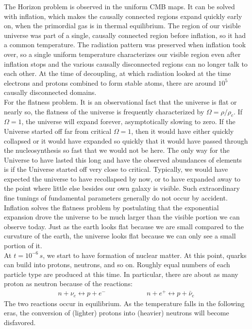 \documentclass[11pt]{article}
\theoremstyle{break}
\theoremstyle{break}
\begin{document}
The Horizon problem is observed in the uniform CMB maps. It can be solved with inflation, which makes the causally connected regions expand quickly early on, when the primordial gas is in thermal equilibrium. The region of our visible universe was part of a single, causally connected region before inflation, so
it had a common temperature. The radiation pattern was preserved when inflation took
over, so a single uniform temperature characterizes our visible region even after inflation stops and the various causally disconnected regions can no longer talk to each other. At the time of decoupling, at which radiation looked at the time electrons and protons combined to form stable atoms, there are around $10^5$ 
causally disconnected domains.\\

For the flatness problem. It is an observational fact that the universe is flat or nearly so, the flatness of the universe is frequently characterized by $\Omega =  \rho / \rho_c$. If $\Omega = 1$, the universe will expand forever, asymptotically slowing to zero. If the Universe started off far from critical $\Omega = 1$, then it would have either quickly collapsed or it would have expanded so quickly that it would have passed through the nucleosynthesis so fast that we would not be here. The only way for the Universe to have lasted this long and have the observed abundances of elements is if the Universe started off very close to critical. Typically, we would have expected the universe to have recollapsed by now, or to have expanded away to the point where little else besides our own galaxy is visible. Such extraordinary fine tunings of fundamental parameters generally do not occur by accident. Inflation solves the flatness problem by postulating that the exponential expansion drove the universe to be much larger than the visible portion we can observe today. Just as the earth looks flat because we are small compared to the curvature of the earth, the universe looks flat because we can only see a small portion of it.\\

At $t=10^{-6}\, s$, we start to have formation of nuclear matter. At this point, quarks can build into protons, neutrons, and so on. Roughly equal numbers of each particle type are produced at this time. In particular, there are about as many proton as neutron because of the reactions:
\begin{align*}
n + \nu_e \leftrightarrow p+e^- \qquad\qquad\qquad n+e^+ \leftrightarrow p+\bar{\nu}_e
\end{align*}
The two reactions occur in equilibrium. As the temperature falls in the following eras, the conversion of (lighter)
protons into (heavier) neutrons will become disfavored.\\
\end{document}

